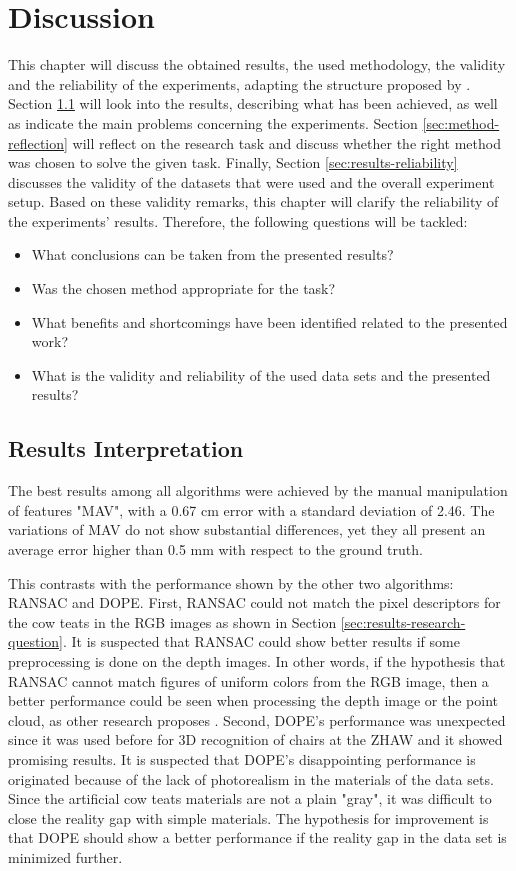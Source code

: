 \chapter{Discussion}\label{chap:discussion}
This chapter will discuss the obtained results, the used methodology, the validity and the reliability of the experiments, adapting the structure proposed by \cite{luckert2016using}. Section \ref{sec:results-interpretation} will look into the results, describing what has been achieved, as well as indicate the main problems concerning the experiments. Section \ref{sec:method-reflection} will reflect on the research task and discuss whether the right method was chosen to solve the given task. Finally, Section \ref{sec:results-reliability} discusses the validity of the datasets that were used and the overall experiment setup. Based on these validity remarks, this chapter will clarify the reliability of the experiments' results. Therefore, the following questions will be tackled:
\begin{itemize}
    \item What conclusions can be taken from the presented results?
    \item Was the chosen method appropriate for the task?
    \item What benefits and shortcomings have been identified related to the presented work?
    \item What is the validity and reliability of the used data sets and the presented results?
\end{itemize}

\section{Results Interpretation}\label{sec:results-interpretation}
The best results among all algorithms were achieved by the manual manipulation of features "MAV", with a 0.67 cm error with a standard deviation of 2.46. The variations of MAV do not show substantial differences, yet they all present an average error higher than 0.5 mm with respect to the ground truth. 

This contrasts with the performance shown by the other two algorithms: RANSAC and DOPE. First, RANSAC could not match the pixel descriptors for the cow teats in the RGB images as shown in Section \ref{sec:results-research-question}. It is suspected that RANSAC could show better results if some preprocessing is done on the depth images. In other words, if the hypothesis that RANSAC cannot match figures of uniform colors from the RGB image, then a better performance could be seen when processing the depth image or the point cloud, as other research proposes \cite{papazov2010efficient}. Second, DOPE's performance was unexpected since it was used before for 3D recognition of chairs at the ZHAW and it showed promising results. It is suspected that DOPE's disappointing performance is originated because of the lack of photorealism in the materials of the data sets. Since the artificial cow teats materials are not a plain "gray", it was difficult to close the reality gap with simple materials. The hypothesis for improvement is that DOPE should show a better performance if the reality gap in the data set is minimized further.


